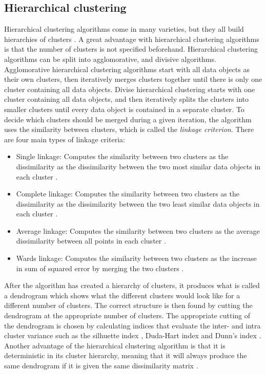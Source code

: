 \subsection{Hierarchical clustering}
Hierarchical clustering algorithms come in many varieties, but they all build hierarchies of clusters \cite{espen}.
A great advantage with hierarchical clustering algorithms is that the number of clusters is not specified beforehand. 
Hierarchical clustering algorithms can be split into agglomorative, and divisive algorithms.
Agglomorative hierarchical clustering algorithms start with all data objects as their own clusters, then iteratively merges clusters together until there is only one cluster containing all data objects.
Divise hierarchical clustering starts with one cluster containing all data objects, and then iteratively splits the clusters into smaller clusters until every data object is contained in a separate cluster.
To decide which clusters should be merged during a given iteration, the algorithm uses the similarity between clusters, which is called the \textit{linkage criterion}.
There are four main types of linkage criteria: 
\begin{itemize}
    \item Single linkage:   Computes the similarity between two clusters as the dissimilarity as the dissimilarity between the two most similar data objects in each cluster \cite{dependency_tsc_energy_markets}.
    \item Complete linkage: Computes the similarity between two clusters as the dissimilarity as the dissimilarity between the two least similar data objects in each cluster \cite{financial_tsc_variance_ratio}.
    \item Average linkage:  Computes the similarity between two clusters as the average dissimilarity between all points in each cluster \cite{dependency_tsc_energy_markets}.
    \item Wards linkage:    Computes the similarity between two clusters as the increase in sum of squared error by merging the two clusters \cite{copula_ica_tsc}.
\end{itemize}

After the algorithm has created a hierarchy of clusters, it produces what is called a dendrogram which shows what the different clusters would look like for a different number of clusters. 
The correct structure is then found by cutting the dendrogram at the appropriate number of clusters. 
The appropriate cutting of the dendrogram is chosen by calculating indices that evaluate the inter- and intra cluster variance such as the silhuette index \cite{BSLEX_nonlin_nonstat_tsc, copula_ica_tsc}, Duda-Hart index \cite{financial_tsc_variance_ratio} and Dunn's index \cite{tsc_total_variation_distance}.
Another advantage of the hierarchical clustering algorithm is that it is deterministic in its cluster hierarchy, 
meaning that it will always produce the same dendrogram if it is given the same dissimilarity matrix \cite{espen}.

